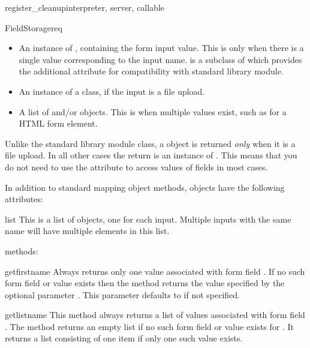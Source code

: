 \begin{funcdesc}{register_cleanup}{interpreter, server, callable}
\begin{classdesc}{FieldStorage}{req}
  \begin{itemize}
  \item
    An instance of , containing the form input
    value. This is only when there is a single value corresponding to the
    input name.  is a subclass of  which
    provides the additional  attribute for compatibility
    with standard library  module.
  \item
    An instance of a  class, if the input is a file upload.
  \item
    A list of  and/or  objects. This is
    when multiple values exist, such as for a  HTML form
    element.
  \end{itemize}

  \begin{notice}
    Unlike the standard library  module
     class, a  object is returned
    \emph{only} when it is a file upload. In all other cases the
    return is an instance of . This means that you
    do not need to use the  attribute to access values
    of fields in most cases.
  \end{notice}

  In addition to standard mapping object methods,  objects
  have the following attributes:

  \begin{memberdesc}{list}
    This is a list of  objects, one for each input. Multiple
    inputs with the same name will have multiple elements in this list.
  \end{memberdesc}

   methods:

  \begin{methoddesc}[FieldStorage]{getfirst}{name}
    Always returns only one value associated with form field
    . If no such form field or value exists then the method
    returns the value specified by the optional parameter
    . This parameter defaults to  if not
    specified.
  \end{methoddesc}

  \begin{methoddesc}[FieldStorage]{getlist}{name}
    This method always returns a list of values associated with form
    field . The method returns an empty list if no such form
    field or value exists for . It returns a list consisting
    of one item if only one such value exists.
  \end{methoddesc}


\end{classdesc}
\end{funcdesc}
